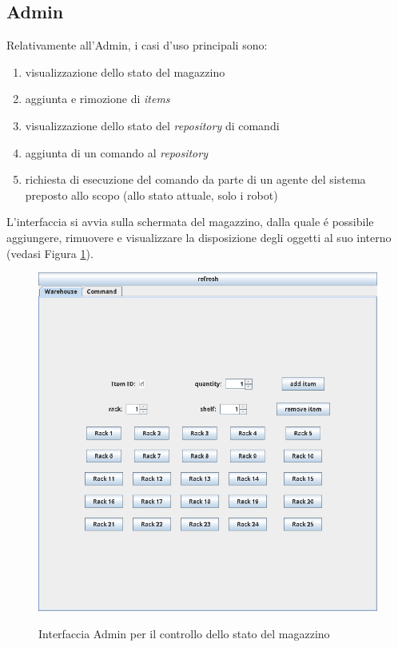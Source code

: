 \subsection{Admin}
Relativamente all'Admin, i casi d'uso principali sono:
\begin{enumerate}
    \item visualizzazione dello stato del magazzino
    \item aggiunta e rimozione di \textit{items}
    \item visualizzazione dello stato del \textit{repository} di comandi
    \item aggiunta di un comando al \textit{repository}
    \item richiesta di esecuzione del comando da parte di un agente del sistema preposto allo scopo (allo stato attuale, solo i robot)
\end{enumerate}
L'interfaccia si avvia sulla schermata del magazzino, dalla quale \'e possibile aggiungere, rimuovere e visualizzare la disposizione degli oggetti al suo interno (vedasi Figura \ref{fig:application-warehouse}).
\begin{figure}
    \includegraphics[width=\textwidth]{section/usage_examples/figure/application-warehouse.png}
    \label{fig:application-warehouse}
    \caption{Interfaccia Admin per il controllo dello stato del magazzino}
\end{figure}

